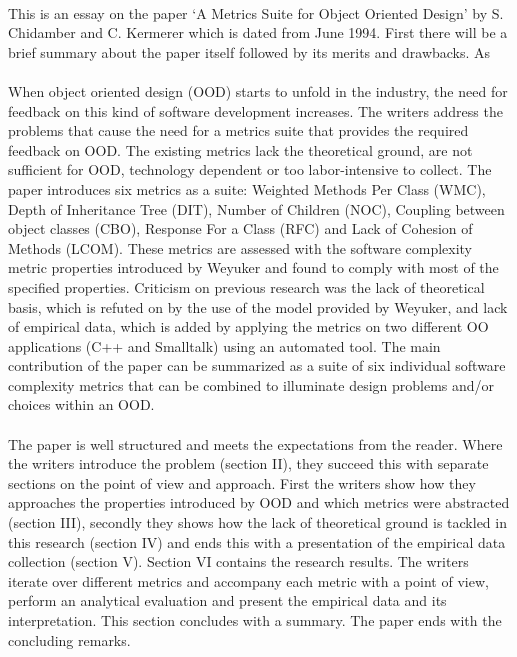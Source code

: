 \paragraph{}
This is an essay on the paper `A Metrics Suite for Object Oriented Design' \autocite{METRICS_SUITE} by S. Chidamber and C.
Kermerer which is dated from June 1994. First there will be a brief summary about the paper itself followed by
its merits and drawbacks. As

\paragraph{}
When object oriented design (OOD) starts to unfold in the industry, the need for feedback on this kind of software
development increases. The writers address the problems that cause the need for a metrics suite that provides the
required feedback on OOD. The existing metrics lack the theoretical ground, are not sufficient for OOD,
technology dependent or too labor-intensive to collect.
The paper introduces six metrics as a suite: Weighted Methods Per Class (WMC), Depth of Inheritance Tree (DIT),
Number of Children (NOC), Coupling between object classes (CBO), Response For a Class (RFC) and Lack of
Cohesion of Methods (LCOM). These metrics are assessed with the software complexity metric properties introduced by
Weyuker \autocite{WEYUKER} and found to comply with most of the specified properties.
Criticism on previous research was the lack of theoretical basis, which is refuted on by the use of the
model provided by Weyuker, and lack of empirical data, which is added by applying the metrics on two different OO
applications (C++ and Smalltalk) using an automated tool. The main contribution of the paper can be summarized as a
suite of six individual software complexity metrics that can be combined to illuminate design problems and/or choices
within an OOD.

\paragraph{}
The paper is well structured and meets the expectations from the reader. Where the writers introduce the problem
(section II), they succeed this with separate sections on the point of view and approach. First the writers show how they
approaches the properties introduced by OOD and which metrics were abstracted (section III), secondly they shows how the
lack of theoretical ground is tackled in this research (section IV) and ends this with a presentation of the empirical
data collection (section V). Section VI contains the research results. The writers iterate over different metrics and
accompany each metric with a point of view, perform an analytical evaluation and present the empirical data and its
interpretation. This section concludes with a summary. The paper ends with the concluding remarks.

